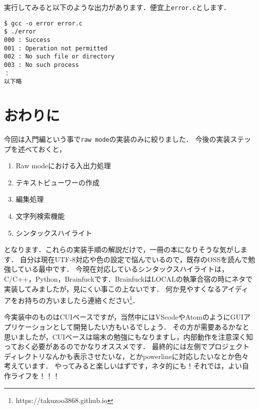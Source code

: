 実行してみると以下のような出力があります．便宜上\texttt{error.c}とします．

\begin{verbatim}
$ gcc -o error error.c
$ ./error
000 : Success
001 : Operation not permitted
002 : No such file or directory
003 : No such process
：
以下略
\end{verbatim}

\newpage

\section{おわりに}
今回は入門編という事で\texttt{raw mode}の実装のみに絞りました．
今後の実装ステップを述べておくと，
\begin{enumerate}
\item Raw modeにおける入出力処理
\item テキストビューワーの作成
\item 編集処理
\item 文字列検索機能
\item シンタックスハイライト
\end{enumerate}
となります．これらの実装手順の解説だけで，一冊の本になりそうな気がします．
自分は現在UTF-8対応や色の設定で悩んでいるので，既存のOSSを読んで勉強している最中です．
今現在対応しているシンタックスハイライトは，C/C++，Python，Brainfuckです．BrainfuckはLOCALの執筆合宿の時にネタで実装してみましたが，見にくい事この上ないです．
何か見やすくなるアイディアをお持ちの方いましたら連絡ください\footnote{https://takuzoo3868.github.io}．

今実装中のものはCUIベースですが，当然中にはVScodeやAtomのようにGUIアプリケーションとして開発したい方もいるでしょう．
その方が需要あるかなと思いましたが，CUIベースは端末の勉強にもなりますし，内部動作を注意深く知っておく必要があるのでかなりオススメです．
最終的には左側でプロジェクトディレクトリなんかも表示させたいな，とかpowerlineに対応したいなとか色々考えています．
やってみると楽しいはずです，ネタ的にも！それでは，よい自作ライフを！！！